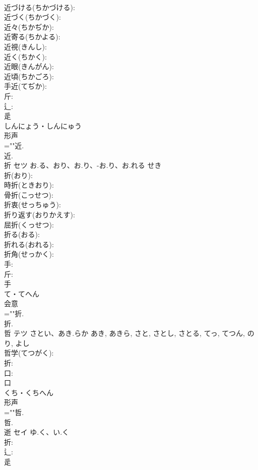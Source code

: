 \documentclass[8pt]{extreport}
\begin{document}
\begin{CJK}{UTF8}{min}
\\	近づける(ちかづける): 
\\	近づく(ちかづく): 
\\	近々(ちかぢか): 
\\	近寄る(ちかよる): 
\\	近視(きんし): 
\\	近く(ちかく): 
\\	近眼(きんがん): 
\\	近頃(ちかごろ): 
\\	手近(てぢか): 
\\	斤: 
\\	辶: 
\\	辵	
\\	しんにょう・しんにゅう	
\\	形声 
\\	=""近.
\\	近.
\\	折	セツ	お.る、おり、お.り、-お.り、お.れる	せき	
\\	折(おり): 
\\	時折(ときおり): 
\\	骨折(こっせつ): 
\\	折衷(せっちゅう): 
\\	折り返す(おりかえす): 
\\	屈折(くっせつ): 
\\	折る(おる): 
\\	折れる(おれる): 
\\	折角(せっかく): 
\\	手: 
\\	斤: 
\\	手	
\\	て・てへん	
\\	会意 
\\	=""折.
\\	折.
\\	哲	テツ	さとい、あき.らか	あき, あきら, さと, さとし, さとる, てっ, てつん, のり, よし	
\\	哲学(てつがく): 
\\	折: 
\\	口: 
\\	口	
\\	くち・くちへん	
\\	形声 
\\	=""哲.
\\	哲.
\\	逝	セイ	ゆ.く、い.く		
\\	折: 
\\	辶: 
\\	辵	

\end{CJK}
\end{document}
